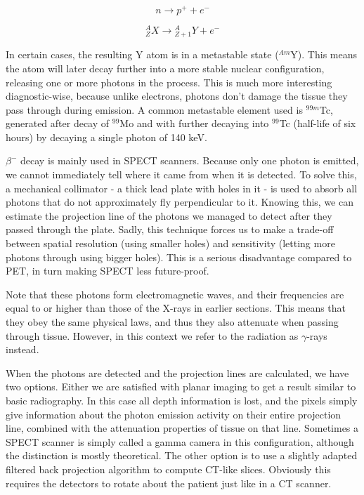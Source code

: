 \begin{equation}
	n \rightarrow p^+ + e^-
\end{equation}

\begin{equation}
	{}_Z^AX \rightarrow {}_{Z+1}^AY + e^-
\end{equation}

In certain cases, the resulting Y atom is in a metastable state ($^{Am}$Y).
This means the atom will later decay further into a more stable nuclear
configuration, releasing one or more photons in the process. This is much more
interesting diagnostic-wise, because unlike electrons, photons don't damage the
tissue they pass through during emission. A common metastable element
used is $^{99m}$Tc, generated after decay of $^{99}$Mo and with further decaying
into $^{99}$Tc (half-life of six hours) by decaying a single photon of 140 keV.


$\beta^-$ decay is mainly used in SPECT scanners. Because only one photon is
emitted, we cannot immediately tell where it came from when it is detected. To
solve this, a mechanical collimator - a thick lead plate with holes in it - is
used to absorb all photons that do not approximately fly perpendicular to it.
Knowing this, we can estimate the projection line of the photons we managed to
detect after they passed through the plate. Sadly, this technique forces us to
make a trade-off between spatial resolution (using smaller holes) and
sensitivity (letting more photons through using bigger holes). This is a serious
disadvantage compared to PET, in turn making SPECT less future-proof.

Note that these photons form electromagnetic waves, and their frequencies are
equal to or higher than those of the X-rays in earlier sections. This means that
they obey the same physical laws, and thus they also attenuate when passing
through tissue. However, in this context we refer to the radiation as
$\gamma$-rays instead.

When the photons are detected and the projection lines are calculated, we have
two options. Either we are satisfied with planar imaging to get a result similar
to basic radiography. In this case all depth information is lost, and the pixels
simply give information about the photon emission activity on their entire
projection line, combined with the attenuation properties of tissue on that
line. Sometimes a SPECT scanner is simply called a gamma camera in this
configuration, although the distinction is mostly theoretical. The other option
is to use a slightly adapted filtered back projection algorithm to compute
CT-like slices. Obviously this requires the detectors to rotate about the
patient just like in a CT scanner.


